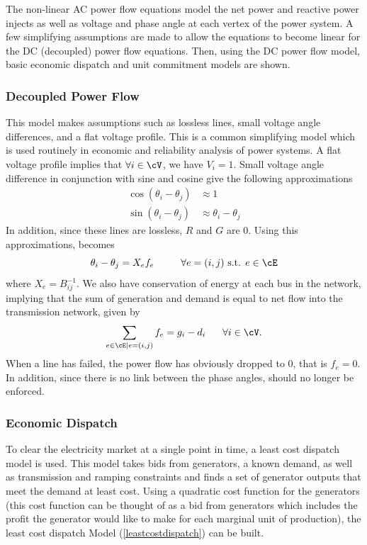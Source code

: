 The non-linear AC power flow equations model the net power and reactive power injects as well as voltage and phase angle at each vertex of the power system.  A few simplifying assumptions are made to allow the equations to become linear for the DC (decoupled) power flow equations.  Then, using the DC power flow model, basic economic dispatch and unit commitment models are shown.  

\subsubsection{Decoupled Power Flow}
This model makes assumptions such as lossless lines, small voltage angle differences, and a flat voltage profile.  This is a common simplifying model which is used routinely in economic and reliability analysis of power systems.  A flat voltage profile implies that $\forall i \in \cV$, we have $V_i = 1$.  Small voltage angle difference in conjunction with sine and cosine give the following approximations
\begin{align}
\cos(\theta_i - \theta_j) &\approx 1	\\
\sin(\theta_i-\theta_j) & \approx \theta_i - \theta_j
\end{align}
In addition, since these lines are lossless, $R$ and $G$ are 0.  Using this approximations,  becomes
\begin{equation}	\displaystyle
\theta_{i} - \theta_{j} = X_{e} f_{e}			\hspace{27px}	\forall e=(i,j) \mbox{ s.t. } e \in \cE   \label{pf2}
\end{equation}
where $X_e = B_{ij}^{-1}$.  We also have conservation of energy at each bus in the network, implying that the sum of generation and demand is equal to net flow into the transmission network, given by
\begin{equation}
\sum_{e \in \cE | e=(i,j)}{f_{e}} = g_{i} -d_{i} \hspace{17px}   \forall i \in \cV.   \label{pf1}
\end{equation}
When a line has failed, the power flow has obviously dropped to 0, that is $f_e = 0$.  In addition,  since there is no link between the phase angles,  should no longer be enforced.

\subsubsection{Economic Dispatch}
To clear the electricity market at a single point in time, a least cost dispatch model is used.  This model takes bids from generators, a known demand, as well as transmission and ramping constraints and finds a set of generator outputs that meet the demand at least cost.  Using a quadratic cost function for the generators (this cost function can be thought of as a bid from generators which includes the profit the generator would like to make for each marginal unit of production), the least cost dispatch Model (\ref{leastcostdispatch}) can be built. 

